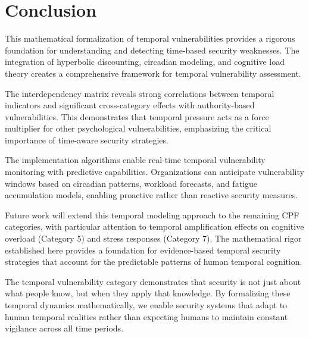 \documentclass[11pt,a4paper]{article}
\begin{document}
\section{Conclusion}

This mathematical formalization of temporal vulnerabilities provides a rigorous foundation for understanding and detecting time-based security weaknesses. The integration of hyperbolic discounting, circadian modeling, and cognitive load theory creates a comprehensive framework for temporal vulnerability assessment.

The interdependency matrix reveals strong correlations between temporal indicators and significant cross-category effects with authority-based vulnerabilities. This demonstrates that temporal pressure acts as a force multiplier for other psychological vulnerabilities, emphasizing the critical importance of time-aware security strategies.

The implementation algorithms enable real-time temporal vulnerability monitoring with predictive capabilities. Organizations can anticipate vulnerability windows based on circadian patterns, workload forecasts, and fatigue accumulation models, enabling proactive rather than reactive security measures.

Future work will extend this temporal modeling approach to the remaining CPF categories, with particular attention to temporal amplification effects on cognitive overload (Category 5) and stress responses (Category 7). The mathematical rigor established here provides a foundation for evidence-based temporal security strategies that account for the predictable patterns of human temporal cognition.

The temporal vulnerability category demonstrates that security is not just about what people know, but when they apply that knowledge. By formalizing these temporal dynamics mathematically, we enable security systems that adapt to human temporal realities rather than expecting humans to maintain constant vigilance across all time periods.
\end{document}
